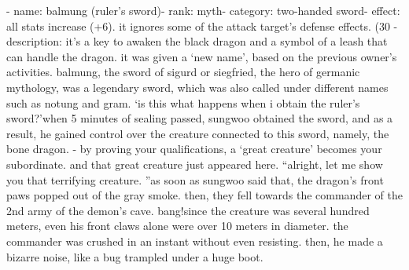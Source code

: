 - name: balmung (ruler’s sword)- rank: myth- category: two-handed sword- effect: all stats increase (+6).
 it ignores some of the attack target’s defense effects.
 (30%
- description: it’s a key to awaken the black dragon and a symbol of a leash that can handle the dragon.
 it was given a ‘new name’, based on the previous owner’s activities.
balmung, the sword of sigurd or siegfried, the hero of germanic mythology, was a legendary sword, which was also called under different names such as notung and gram.
‘is this what happens when i obtain the ruler’s sword?’when 5 minutes of sealing passed, sungwoo obtained the sword, and as a result, he gained control over the creature connected to this sword, namely, the bone dragon.
- by proving your qualifications, a ‘great creature’ becomes your subordinate.
and that great creature just appeared here.
“alright, let me show you that terrifying creature.
”as soon as sungwoo said that, the dragon’s front paws popped out of the gray smoke.
 then, they fell towards the commander of the 2nd army of the demon’s cave.
bang!since the creature was several hundred meters, even his front claws alone were over 10 meters in diameter.
 the commander was crushed in an instant without even resisting.
 then, he made a bizarre noise, like a bug trampled under a huge boot.


 